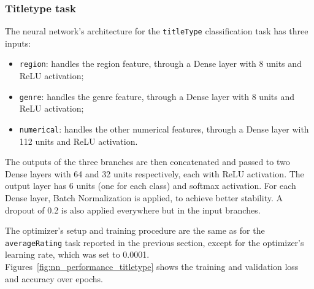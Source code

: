 \subsubsection{Titletype task}
The neural network's architecture for the \texttt{titleType}
classification task has three inputs:
\begin{itemize}
    \item \texttt{region}: handles the region feature, through
    a Dense layer with 8 units and ReLU activation;
    \item \texttt{genre}: handles the genre feature, through
    a Dense layer with 8 units and ReLU activation;
    \item \texttt{numerical}: handles the other numerical
    features, through a Dense layer with 112 units and ReLU
    activation.
\end{itemize}
The outputs of the three branches are then concatenated and
passed to two Dense layers with 64 and 32 units respectively,
each with ReLU activation.
The output layer has 6 units (one for each class) and
softmax activation.
For each Dense layer, Batch Normalization is applied,
to achieve better stability.
A dropout of 0.2 is also applied everywhere but in the input
branches.

The optimizer's setup and training procedure are the same as for
the \texttt{averageRating} task reported in the previous section,
except for the optimizer's learning rate, which was set to
0.0001.\\

Figures~\ref{fig:nn_performance_titletype}
shows the training and validation loss and accuracy over epochs.


